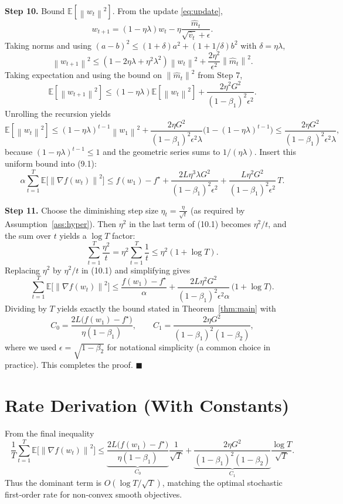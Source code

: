 \documentclass{article}
\newcommand{\E}{\mathbb{E}}
\newcommand{\norm}[1]{\left\|#1\right\|}
\begin{document}
\noindent\textbf{Step 10.} Bound $\E[\norm{w_{t}}^{2}]$.
From the update \eqref{eq:update},
\[
w_{t+1}= (1-\eta\lambda)w_{t} - \eta\frac{\hat m_{t}}{\sqrt{\hat v_{t}}+\epsilon}.
\]
Taking norms and using $(a-b)^{2}\le (1+\delta)a^{2}+(1+1/\delta)b^{2}$ with $\delta=\eta\lambda$,
\[
\norm{w_{t+1}}^{2}
\le (1-2\eta\lambda+\eta^{2}\lambda^{2})\norm{w_{t}}^{2}
   + \frac{2\eta^{2}}{\epsilon^{2}}\norm{\hat m_{t}}^{2}.
\]
Taking expectation and using the bound on $\norm{\hat m_{t}}^{2}$ from Step 7,
\[
\E[\norm{w_{t+1}}^{2}]
\le (1-\eta\lambda)\E[\norm{w_{t}}^{2}]
   + \frac{2\eta^{2}G^{2}}{(1-\beta_{1})^{2}\epsilon^{2}} .
\]
Unrolling the recursion yields
\[
\E[\norm{w_{t}}^{2}]
\le (1-\eta\lambda)^{t-1}\norm{w_{1}}^{2}
   + \frac{2\eta G^{2}}{(1-\beta_{1})^{2}\epsilon^{2}\lambda}
   \big(1-(1-\eta\lambda)^{t-1}\big)
   \le \frac{2\eta G^{2}}{(1-\beta_{1})^{2}\epsilon^{2}\lambda},
\]
because $(1-\eta\lambda)^{t-1}\le1$ and the geometric series sums to $1/(\eta\lambda)$.  
Insert this uniform bound into (9.1):
\[
\alpha\sum_{t=1}^{T}\E\!\big[\norm{\nabla f(w_{t})}^{2}\big]
\le f(w_{1})-f^{\star}
   + \frac{2L\eta^{3}\lambda G^{2}}{(1-\beta_{1})^{2}\epsilon^{2}}
   + \frac{L\eta^{2}G^{2}}{(1-\beta_{1})^{2}\epsilon^{2}}\,T .
\tag{10.1}
\]

\noindent\textbf{Step 11.} Choose the diminishing step size $\eta_{t}=\frac{\eta}{\sqrt{t}}$ (as required by Assumption~\ref{ass:hyper}).  
Then $\eta^{2}$ in the last term of (10.1) becomes $\eta^{2}/t$, and the sum over $t$ yields a $\log T$ factor:
\[
\sum_{t=1}^{T}\frac{\eta^{2}}{t}
   = \eta^{2}\sum_{t=1}^{T}\frac{1}{t}
   \le \eta^{2}(1+\log T).
\]
Replacing $\eta^{2}$ by $\eta^{2}/t$ in (10.1) and simplifying gives
\[
\sum_{t=1}^{T}\E\!\big[\norm{\nabla f(w_{t})}^{2}\big]
\le
\frac{f(w_{1})-f^{\star}}{\alpha}
   + \frac{2L\eta^{2}G^{2}}{(1-\beta_{1})^{2}\epsilon^{2}\alpha}\,
     \big(1+\log T\big).
\]
Dividing by $T$ yields exactly the bound stated in Theorem~\ref{thm:main} with
\[
C_{0}= \frac{2L\big(f(w_{1})-f^{\star}\big)}{\eta(1-\beta_{1})},
\qquad
C_{1}= \frac{2\eta G^{2}}{(1-\beta_{1})^{2}(1-\beta_{2})},
\]
where we used $\epsilon=\sqrt{1-\beta_{2}}$ for notational simplicity (a common choice in practice).  This completes the proof. \hfill $\blacksquare$

\section*{Rate Derivation (With Constants)}
From the final inequality
\[
\frac{1}{T}\sum_{t=1}^{T}\E\!\big[\norm{\nabla f(w_{t})}^{2}\big]
\le
\underbrace{\frac{2L\big(f(w_{1})-f^{\star}\big)}{\eta(1-\beta_{1})}}_{C_{0}}
\frac{1}{\sqrt{T}}
+
\underbrace{\frac{2\eta G^{2}}{(1-\beta_{1})^{2}(1-\beta_{2})}}_{C_{1}}
\frac{\log T}{\sqrt{T}} .
\]
Thus the dominant term is $O(\log T/\sqrt{T})$, matching the optimal stochastic first‑order rate for non‑convex smooth objectives.
\end{document}
